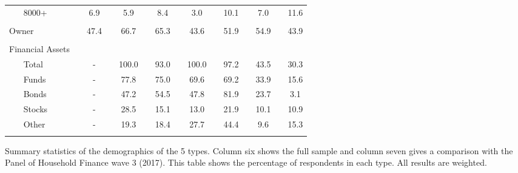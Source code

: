 \begin{table}[ht!]
{\begin{threeparttable}
\begin{tabular}{ll|cccccccccccccc}
	& 8000+ &  & 6.9 &  & 5.9 &  & 8.4 &  & 3.0 &  & 10.1 &  & 7.0 &  & 11.6 \\
	&  &  &  &  &  &  &  &  &  &  &  &  &  &  &  \\
	\multicolumn{2}{l|}{Owner} &  & 47.4 &  & 66.7 &  & 65.3 &  & 43.6 &  & 51.9 &  & 54.9 &  & 43.9 \\
	&  &  &  &  &  &  &  &  &  &  &  &  &  &  &  \\
	\multicolumn{2}{l|}{Financial   Assets} &  &  &  &  &  &  &  &  &  &  &  &  &  &  \\
	& Total &  & - &  & 100.0 &  & 93.0 &  & 100.0 &  & 97.2 &  & 43.5 &  & 30.3 \\
	& Funds &  & - &  & 77.8 &  & 75.0 &  & 69.6 &  & 69.2 &  & 33.9 &  & 15.6 \\
	& Bonds &  & - &  & 47.2 &  & 54.5 &  & 47.8 &  & 81.9 &  & 23.7 &  & 3.1 \\
	& Stocks &  & - &  & 28.5 &  & 15.1 &  & 13.0 &  & 21.9 &  & 10.1 &  & 10.9 \\
	& Other &  & - &  & 19.3 &  & 18.4 &  & 27.7 &  & 44.4 &  & 9.6 &  & 15.3 \\
	&  &  &  &  &  &  &  &  &  &  &  &  &  &  &    \\ \hline \hline 
\end{tabular}
		\begin{tablenotes}\footnotesize
				\item[] Summary statistics of the demographics of the 5 types. Column six shows the full sample and column seven gives a comparison with the Panel of Household Finance wave 3 (2017). This table shows the percentage of respondents in each type. All results are weighted.
			\end{tablenotes}
		\end{threeparttable}
	}
\end{table}